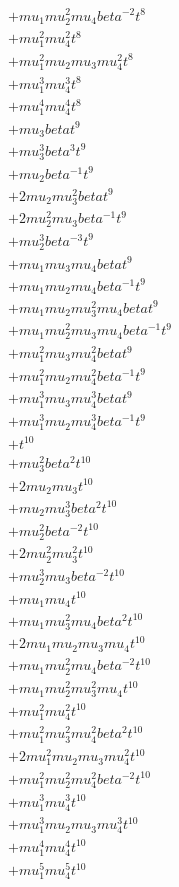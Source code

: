 \begin{align*}
  + mu_1 mu_2^{2} mu_4 beta^{-2} t^{8} \\
  + mu_1^{2} mu_4^{2} t^{8} \\
  + mu_1^{2} mu_2 mu_3 mu_4^{2} t^{8} \\
  + mu_1^{3} mu_4^{3} t^{8} \\
  + mu_1^{4} mu_4^{4} t^{8} \\
  + mu_3 beta t^{9} \\
  + mu_3^{3} beta^{3} t^{9} \\
  + mu_2 beta^{-1} t^{9} \\
  + 2 mu_2 mu_3^{2} beta t^{9} \\
  + 2 mu_2^{2} mu_3 beta^{-1} t^{9} \\
  + mu_2^{3} beta^{-3} t^{9} \\
  + mu_1 mu_3 mu_4 beta t^{9} \\
  + mu_1 mu_2 mu_4 beta^{-1} t^{9} \\
  + mu_1 mu_2 mu_3^{2} mu_4 beta t^{9} \\
  + mu_1 mu_2^{2} mu_3 mu_4 beta^{-1} t^{9} \\
  + mu_1^{2} mu_3 mu_4^{2} beta t^{9} \\
  + mu_1^{2} mu_2 mu_4^{2} beta^{-1} t^{9} \\
  + mu_1^{3} mu_3 mu_4^{3} beta t^{9} \\
  + mu_1^{3} mu_2 mu_4^{3} beta^{-1} t^{9} \\
  + t^{10} \\
  + mu_3^{2} beta^{2} t^{10} \\
  + 2 mu_2 mu_3 t^{10} \\
  + mu_2 mu_3^{3} beta^{2} t^{10} \\
  + mu_2^{2} beta^{-2} t^{10} \\
  + 2 mu_2^{2} mu_3^{2} t^{10} \\
  + mu_2^{3} mu_3 beta^{-2} t^{10} \\
  + mu_1 mu_4 t^{10} \\
  + mu_1 mu_3^{2} mu_4 beta^{2} t^{10} \\
  + 2 mu_1 mu_2 mu_3 mu_4 t^{10} \\
  + mu_1 mu_2^{2} mu_4 beta^{-2} t^{10} \\
  + mu_1 mu_2^{2} mu_3^{2} mu_4 t^{10} \\
  + mu_1^{2} mu_4^{2} t^{10} \\
  + mu_1^{2} mu_3^{2} mu_4^{2} beta^{2} t^{10} \\
  + 2 mu_1^{2} mu_2 mu_3 mu_4^{2} t^{10} \\
  + mu_1^{2} mu_2^{2} mu_4^{2} beta^{-2} t^{10} \\
  + mu_1^{3} mu_4^{3} t^{10} \\
  + mu_1^{3} mu_2 mu_3 mu_4^{3} t^{10} \\
  + mu_1^{4} mu_4^{4} t^{10} \\
  + mu_1^{5} mu_4^{5} t^{10}
\end{align*}
